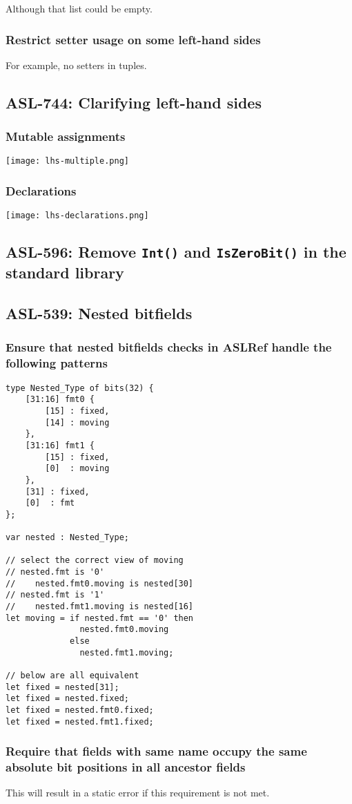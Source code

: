 Although that list could be empty.

\subsubsection{Restrict setter usage on some left-hand sides}

For example, no setters in tuples.

\subsection{ASL-744: Clarifying left-hand sides}

\subsubsection{Mutable assignments}

\texttt{[image: lhs-multiple.png]}

\subsubsection{Declarations}

\texttt{[image: lhs-declarations.png]}

\subsection{ASL-596: Remove \texttt{Int()} and \texttt{IsZeroBit()} in the standard library}

\subsection{ASL-539: Nested bitfields}

\subsubsection{Ensure that nested bitfields checks in ASLRef handle the following patterns}

\begin{verbatim}
type Nested_Type of bits(32) {
    [31:16] fmt0 {
        [15] : fixed,
        [14] : moving
    },
    [31:16] fmt1 {
        [15] : fixed,
        [0]  : moving
    },
    [31] : fixed,
    [0]  : fmt
};

var nested : Nested_Type;

// select the correct view of moving
// nested.fmt is '0'
//    nested.fmt0.moving is nested[30]
// nested.fmt is '1'
//    nested.fmt1.moving is nested[16]
let moving = if nested.fmt == '0' then
               nested.fmt0.moving
             else
               nested.fmt1.moving;

// below are all equivalent
let fixed = nested[31];
let fixed = nested.fixed;
let fixed = nested.fmt0.fixed;
let fixed = nested.fmt1.fixed;
\end{verbatim}

\subsubsection{Require that fields with same name occupy the same absolute bit
positions in all ancestor fields}

This will result in a static error if this requirement is not met.

